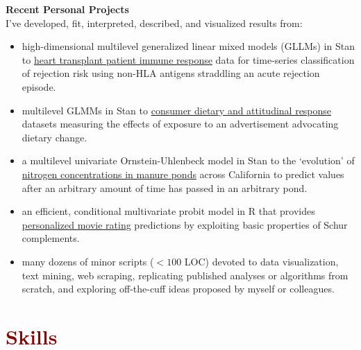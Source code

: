 \documentclass[11pt,margin,line]{resume}
\begin{document}
\begin{resume}
\textbf{Recent Personal Projects}\\
I've developed, fit, interpreted, described, and visualized results from:
\begin{itemize}[noitemsep]
\item high-dimensional multilevel generalized linear mixed models (GLLMs) in Stan to \ul{heart transplant patient immune response} data for time-series classification of rejection risk using non-HLA antigens straddling an acute rejection episode.
\item multilevel GLMMs in Stan to \ul{consumer dietary and attitudinal response} datasets measuring the effects of exposure to an advertisement advocating dietary change.
\item a multilevel univariate Ornstein-Uhlenbeck model in Stan to the `evolution' of \ul{nitrogen concentrations in manure ponds} across California to predict values after an arbitrary amount of time has passed in an arbitrary pond.
\item an efficient, conditional multivariate probit model in R that provides \ul{personalized movie rating} predictions by exploiting basic properties of Schur complements.
\item many dozens of minor scripts ($<100$ LOC) devoted to data visualization, text mining, web scraping, replicating published analyses or algorithms from scratch, and exploring off-the-cuff ideas proposed by myself or colleagues.
\end{itemize}
\vspace{-1.5mm}

\section{\large\textcolor{DarkRed}{Skills}}

\begin{comment}
\textbf{Technical}: Generalized Linear Regression Analysis (e.g. Gaussian process, spline, poisson, logistic, robust, probit), PCA, Missing Data Imputation / Marginalization, Measurement Error Modeling, Stochastic Processes (e.g. CTMC / DTMC, birth-death, multivariate diffusion), Random Forests, Support Vector Machines, Neural Networks, Natural Language Processing, Expectation-Maximization, Model comparison (e.g. x-validation, information theoretic, marginal likelihood-based methods), Monte Carlo Methods, Clustering, Parallel \& Distributed Computing

\textbf{Other}: Science Communication, Teaching, Project Management, Hitchhiking, Public Speaking, Backpacking, Data Visualization, Googling, Computer Assembly \& Repair, Universal Design, Photography, Image Editing 
\end{comment}



\end{resume}
\end{document}
